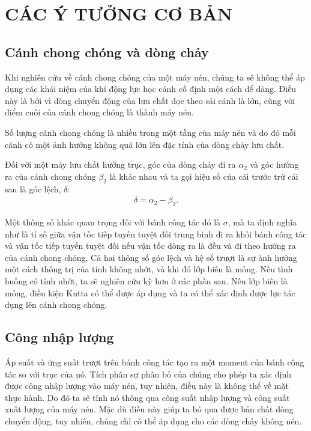 \documentclass[MAY_THUY_KHI.tex]{subfiles}
\begin{document}
\chapter{CÁC Ý TƯỞNG CƠ BẢN}
\newpage
\section{Cánh chong chóng và dòng chảy}
        Khi nghiên cứu về cánh chong chóng của một máy nén, chúng ta sẽ không thể áp dụng các khái niệm của khí động lực học cánh cố định một cách dể dàng. Điều này là bởi vì dòng chuyển động của lưu chất dọc theo sải cánh là lớn, cùng với điểm cuối của cánh chong chóng là thành máy nén.
        
        Số lượng cánh chong chóng là nhiều trong một tầng của máy nén và do đó mỗi cánh có một ảnh hưởng không quá lớn lên đặc tính của dòng chảy lưu chất.

        Đối với một máy lưu chất hướng trục, góc của dòng chảy đi ra $\alpha_2$ và góc hướng ra của cánh chong chóng $\beta_2$ là khác nhau và ta gọi hiệu số của cái trước trừ cái sau là góc lệch, $\delta$:
            \begin{align}
                \delta=\alpha_2-\beta_2.
            \end{align}

        Một thông số khác quan trọng đối với bánh công tác đó là  $\sigma$, mà ta định nghĩa như là tỉ số giữa vận tốc tiếp tuyến tuyệt đối trung bình đi ra khỏi bánh công tác và vận tốc tiếp tuyến tuyệt đối nếu vận tốc dòng ra là đều và đi theo hướng ra của cánh chong chóng. Cả hai thông số góc lệch và hệ số trượt là sự ảnh hưởng một cách thống trị của tính không nhớt, và khi đó lớp biên là mỏng. Nếu tình huống có tính nhớt, ta sẽ nghiên cứu kỹ hơn ở các phần sau. Nếu lớp biên là mỏng, điều kiện Kutta có thể được áp dụng và ta có thể xác định được lực tác dụng lên cánh chong chóng.
\section{Công nhập lượng}
        Áp suất và ứng suất trượt trên bánh công tác tạo ra một moment của bánh công tác so với trục của nó. Tích phân sự phân bố của chúng cho phép ta xác định được công nhập lượng vào máy nén, tuy nhiên, điều này là không thể về mặt thực hành. Do đó ta sẽ tính nó thông qua công suất nhập lượng và công suất xuất lượng của máy nén. Mặc dù điều này giúp ta bỏ qua được bản chất dòng chuyển động, tuy nhiên, chúng chỉ có thể áp dụng cho các dòng chảy không nén.
\end{document}
